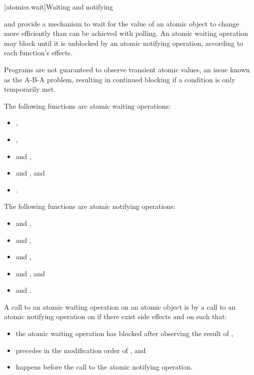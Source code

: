 [atomics.wait]{Waiting and notifying}

\pnum
{}
and 
provide a mechanism to wait for the value of an atomic object to change
more efficiently than can be achieved with polling.
An atomic waiting operation may block until it is unblocked
by an atomic notifying operation, according to each function's effects.
\begin{note}
Programs are not guaranteed to observe transient atomic values,
an issue known as the A-B-A problem,
resulting in continued blocking if a condition is only temporarily met.
\end{note}

\pnum
\begin{note}
The following functions are atomic waiting operations:
\begin{itemize}
\item {},
\item {},
\item {} and ,
\item {} and , and
\item {}.
\end{itemize}
\end{note}

\pnum
\begin{note}
The following functions are atomic notifying operations:
\begin{itemize}
\item {} and ,
\item {} and ,
\item {} and ,
\item {} and , and
\item {} and .
\end{itemize}
\end{note}

%
\pnum
A call to an atomic waiting operation on an atomic object 
is 
by a call to an atomic notifying operation on 
if there exist side effects  and  on  such that:
\begin{itemize}
\item the atomic waiting operation has blocked after observing the result of ,
\item {} precedes  in the modification order of , and
\item {} happens before the call to the atomic notifying operation.
\end{itemize}

